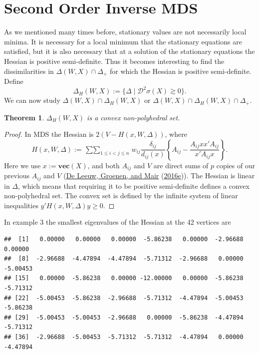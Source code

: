 \documentclass[
  12pt,
]{book}
\newtheorem{theorem}{Theorem}[chapter]
\theoremstyle{definition}
\theoremstyle{definition}
\theoremstyle{definition}
\theoremstyle{definition}
\theoremstyle{remark}
\begin{document}
\hypertarget{second-order-inverse-mds}{%
\section{Second Order Inverse MDS}\label{second-order-inverse-mds}}

As we mentioned many times before, stationary values are not necessarily local minima. It is necessary for a local minimum that the stationary equations are satisfied, but it is also necessary that at a solution of the stationary equations the Hessian is positive semi-definite. Thus it becomes interesting to find the dissimilarities in \(\Delta(W,X)\cap\Delta_+\) for which the Hessian is positive semi-definite. Define
\[
\Delta_H(W,X):=\{\Delta\mid\mathcal{D}^2\sigma(X)\gtrsim 0\}.
\]
We can now study \(\Delta(W,X)\cap\Delta_H(W,X)\) or \(\Delta(W,X)\cap\Delta_H(W,X)\cap\Delta_+\).

\begin{theorem}
\protect\hypertarget{thm:invconvset}{}{\label{thm:invconvset} }\(\Delta_H(W,X)\) is a convex non-polyhedral set.
\end{theorem}

\begin{proof}
In MDS the Hessian is \(2(V-H(x,W,\Delta))\), where
\begin{equation}
H(x,W,\Delta):=\mathop{\sum\sum}_{1\leq i<j\leq n}w_{ij}\frac{\delta_{ij}}{d_{ij}(x)}\left\{A_{ij}-\frac{A_{ij}xx'A_{ij}}{x'A_{ij}x}\right\}.
\end{equation}
Here we use \(x:=\mathbf{vec}(X)\), and both \(A_{ij}\) and \(V\) are direct sums of \(p\) copies of our previous \(A_{ij}\) and \(V\) (\protect\hyperlink{ref-deleeuw_groenen_mair_E_16c}{De Leeuw, Groenen, and Mair} (\protect\hyperlink{ref-deleeuw_groenen_mair_E_16c}{2016e})). The Hessian is linear in \(\Delta\), which means that requiring it to be positive semi-definite defines a convex non-polyhedral set. The convex set is defined by the infinite system of linear inequalities \(y'H(x,W,\Delta)y\geq 0\).
\end{proof}

In example 3 the smallest eigenvalues of the Hessian at the 42 vertices are

\begin{verbatim}
##  [1]   0.00000   0.00000   0.00000  -5.86238   0.00000  -2.96688   0.00000
##  [8]  -2.96688  -4.47894  -4.47894  -5.71312  -2.96688   0.00000  -5.00453
## [15]   0.00000  -5.86238   0.00000 -12.00000   0.00000  -5.86238  -5.71312
## [22]  -5.00453  -5.86238  -2.96688  -5.71312  -4.47894  -5.00453  -5.86238
## [29]  -5.00453  -5.00453  -2.96688   0.00000  -5.86238  -4.47894  -5.71312
## [36]  -2.96688  -5.00453  -5.71312  -5.71312  -4.47894   0.00000  -4.47894
\end{verbatim}
\end{document}

